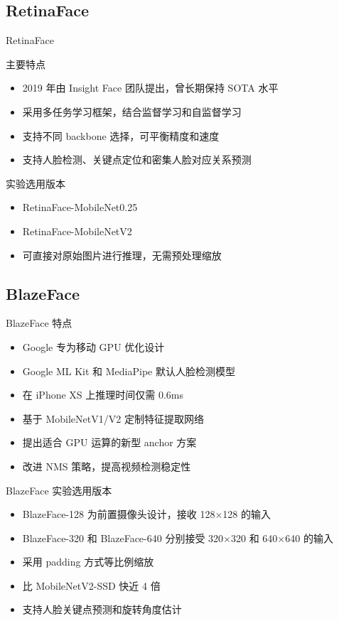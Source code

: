 \documentclass{beamer}
\begin{document}
\subsection{RetinaFace}
\begin{frame}{RetinaFace}
    \begin{block}{主要特点}
        \begin{itemize}
            \item 2019 年由 Insight Face 团队提出，曾长期保持 SOTA 水平
            \item 采用多任务学习框架，结合监督学习和自监督学习
            \item 支持不同 backbone 选择，可平衡精度和速度
            \item 支持人脸检测、关键点定位和密集人脸对应关系预测
        \end{itemize}
    \end{block}

    \begin{block}{实验选用版本}
        \begin{itemize}
            \item RetinaFace-MobileNet0.25
            \item RetinaFace-MobileNetV2
            \item 可直接对原始图片进行推理，无需预处理缩放
        \end{itemize}
    \end{block}
\end{frame}

\subsection{BlazeFace}
\begin{frame}{BlazeFace 特点}
    \begin{itemize}
        \item Google 专为移动 GPU 优化设计
        \item Google ML Kit 和 MediaPipe 默认人脸检测模型
        \item 在 iPhone XS 上推理时间仅需 0.6ms
        \item 基于 MobileNetV1/V2 定制特征提取网络
        \item 提出适合 GPU 运算的新型 anchor 方案
        \item 改进 NMS 策略，提高视频检测稳定性
    \end{itemize}
\end{frame}
\begin{frame}{BlazeFace 实验选用版本}
    \begin{itemize}
        \item BlazeFace-128 为前置摄像头设计，接收 128$\times$128 的输入
        \item BlazeFace-320 和 BlazeFace-640 分别接受 320$\times$320 和 640$\times$640 的输入
        \item 采用 padding 方式等比例缩放
        \item 比 MobileNetV2-SSD 快近 4 倍
        \item 支持人脸关键点预测和旋转角度估计
    \end{itemize}
\end{frame}
\end{document}
